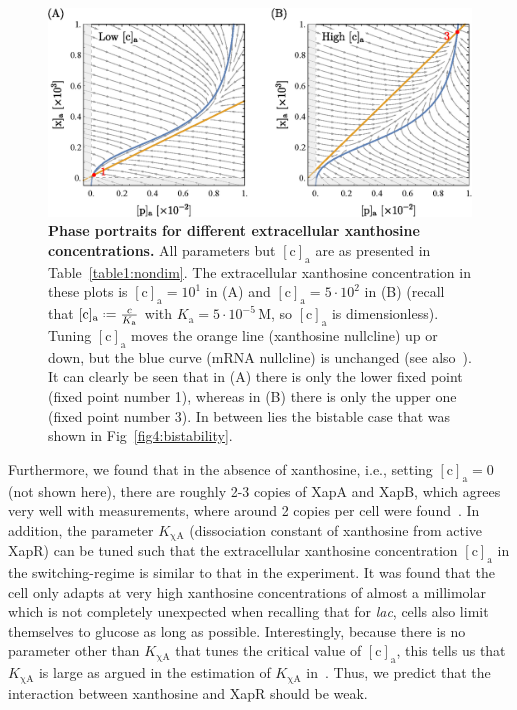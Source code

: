 \documentclass[10pt,letterpaper]{article}
\newcommand{\unit}[1]{\,\mathrm{#1}}
\newcommand{\n}[1]{\mathrm{#1}}
\newcommand*{\defeq}{\mathrel{\vcenter{\baselineskip0.5ex \lineskiplimit0pt
			\hbox{\scriptsize.}\hbox{\scriptsize.}}}%
	=}
\begin{document}
	\begin{figure}%
		\centering
		\includegraphics{media/VaryingC.eps}
		\caption{{\bf Phase portraits for different extracellular xanthosine concentrations.}
			All parameters but $\n{[c]_a}$ are as presented in
			Table~\ref{table1:nondim}. The extracellular xanthosine
			concentration in these plots is $\n{[c]_a}=10^{1}$ in (A) and
			$\n{[c]_a}= 5 \cdot 10^{2}$ in (B) (recall that $\n{[c]_{a}} \defeq
			\frac{c}{K_{\n{a}}}$ with $K_{\n{a}} = 5 \cdot 10^{-5} \unit{M}$,
			so $\n{[c]_a}$ is dimensionless).
			Tuning $\n{[c]_a}$ moves the orange line (xanthosine nullcline) up
			or down, but the blue curve (mRNA nullcline) is unchanged (see
			also~). It can clearly be seen that in (A) there is
			only the lower fixed point (fixed point number 1), whereas in (B)
			there is only the upper one (fixed point number 3). In between lies
			the bistable case that was shown in Fig~\ref{fig4:bistability}.}
		\label{fig5:extraxanth}
	\end{figure}
	
	Furthermore, we found that in the absence of xanthosine, i.e., setting
	$\n{[c]_a}=0$ (not shown here), there are roughly 2-3 copies of XapA and XapB, which agrees very
	well with measurements, where around 2 copies per cell were
	found~\cite{Li2014}. In addition, the parameter $K_{\n{\chi A}}$
	(dissociation constant of xanthosine from active XapR) can be tuned such
	that the extracellular xanthosine concentration $\n{[c]_a}$ in the
	switching-regime is similar to that in the experiment. It was found that the
	cell only adapts at very high xanthosine concentrations of almost a
	millimolar~\cite{Norholm2001} which is not completely unexpected when
	recalling that for \emph{lac}, cells also limit themselves to glucose as
	long as possible. Interestingly, because there is no parameter other than
	$K_{\n{\chi A}}$ that tunes the critical value of $\n{[c]_a}$, this tells us
	that $K_{\n{\chi A}}$ is large as argued in the estimation of $K_{\n{\chi
			A}}$ in~. Thus, we predict that the interaction between xanthosine and XapR
	should be weak.
	
\end{document}
